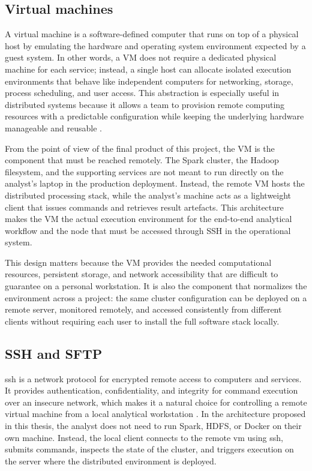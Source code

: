 \subsection{Virtual machines}
\label{subsec:cap2-virtual-machines}

A virtual machine is a software-defined computer that runs on top of a physical host by emulating the hardware and operating system environment expected by a guest system. In other words, a VM does not require a dedicated physical machine for each service; instead, a single host can allocate isolated execution environments that behave like independent computers for networking, storage, process scheduling, and user access. This abstraction is especially useful in distributed systems because it allows a team to provision remote computing resources with a predictable configuration while keeping the underlying hardware manageable and reusable \parencite{steen2016distributed,merkel2014docker}.

From the point of view of the final product of this project, the VM is the component that must be reached remotely. The Spark cluster, the Hadoop filesystem, and the supporting services are not meant to run directly on the analyst's laptop in the production deployment. Instead, the remote VM hosts the distributed processing stack, while the analyst's machine acts as a lightweight client that issues commands and retrieves result artefacts. This architecture makes the VM the actual execution environment for the end-to-end analytical workflow and the node that must be accessed through SSH in the operational system.

This design matters because the VM provides the needed computational resources, persistent storage, and network accessibility that are difficult to guarantee on a personal workstation. It is also the component that normalizes the environment across a project: the same cluster configuration can be deployed on a remote server, monitored remotely, and accessed consistently from different clients without requiring each user to install the full software stack locally.

\subsection{SSH and SFTP}
\label{subsec:cap2-ssh-and-sftp}

\gls{ssh} is a network protocol for encrypted remote access to computers and services. It provides authentication, confidentiality, and integrity for command execution over an insecure network, which makes it a natural choice for controlling a remote virtual machine from a local analytical workstation \parencite{openssh2024}. In the architecture proposed in this thesis, the analyst does not need to run Spark, HDFS, or Docker on their own machine. Instead, the local client connects to the remote \gls{vm} using \gls{ssh}, submits commands, inspects the state of the cluster, and triggers execution on the server where the distributed environment is deployed.

